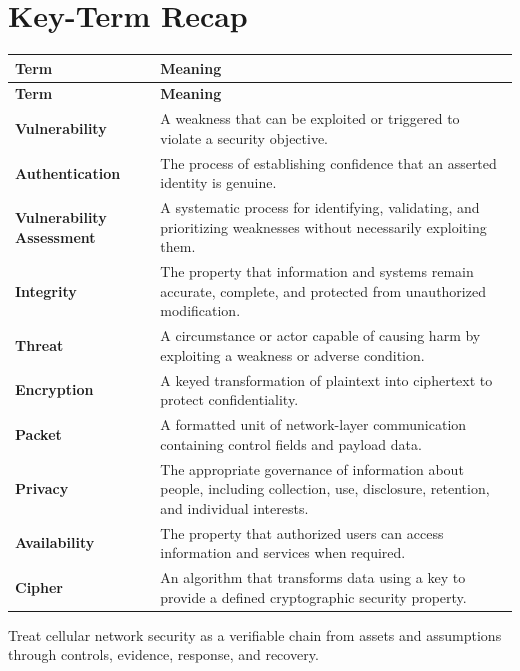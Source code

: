 \documentclass[11pt]{article}
\begin{document}
\section*{Key-Term Recap}
\begin{longtable}{>{\RaggedRight\arraybackslash}p{}>{\RaggedRight\arraybackslash}p{}}
\toprule\rowcolor{Navy}\color{white}\textbf{Term} & \color{white}\textbf{Meaning}\\\midrule
\endfirsthead
\toprule\rowcolor{Navy}\color{white}\textbf{Term} & \color{white}\textbf{Meaning}\\\midrule
\endhead
\textbf{Vulnerability} & A weakness that can be exploited or triggered to violate a security objective. \\\midrule
\textbf{Authentication} & The process of establishing confidence that an asserted identity is genuine. \\\midrule
\textbf{Vulnerability Assessment} & A systematic process for identifying, validating, and prioritizing weaknesses without necessarily exploiting them. \\\midrule
\textbf{Integrity} & The property that information and systems remain accurate, complete, and protected from unauthorized modification. \\\midrule
\textbf{Threat} & A circumstance or actor capable of causing harm by exploiting a weakness or adverse condition. \\\midrule
\textbf{Encryption} & A keyed transformation of plaintext into ciphertext to protect confidentiality. \\\midrule
\textbf{Packet} & A formatted unit of network-layer communication containing control fields and payload data. \\\midrule
\textbf{Privacy} & The appropriate governance of information about people, including collection, use, disclosure, retention, and individual interests. \\\midrule
\textbf{Availability} & The property that authorized users can access information and services when required. \\\midrule
\textbf{Cipher} & An algorithm that transforms data using a key to provide a defined cryptographic security property. \\\midrule
\bottomrule
\end{longtable}
\begin{takeawaybox}
Treat cellular network security as a verifiable chain from assets and assumptions through controls, evidence, response, and recovery.
\end{takeawaybox}
\end{document}
